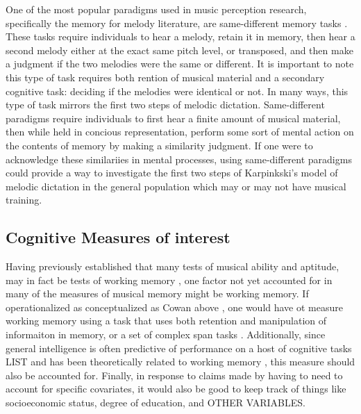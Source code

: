 \documentclass[]{book}
\begin{document}
One of the most popular paradigms used in music perception research, specifically the memory for melody literature, are same-different memory tasks \citep{halpernMemoryMelodies2010}.
These tasks require individuals to hear a melody, retain it in memory, then hear a second melody either at the exact same pitch level, or transposed, and then make a judgment if the two melodies were the same or different.
It is important to note this type of task requires both rention of musical material and a secondary cognitive task: deciding if the melodies were identical or not.
In many ways, this type of task mirrors the first two steps of melodic dictation.
Same-different paradigms require individuals to first hear a finite amount of musical material, then while held in concious representation, perform some sort of mental action on the contents of memory by making a similarity judgment.
If one were to acknowledge these similariies in mental processes, using same-different paradigms could provide a way to investigate the first two steps of Karpinkski's model of melodic dictation in the general population which may or may not have musical training.

\hypertarget{cognitive-measures-of-interest}{%
\subsection{Cognitive Measures of interest}\label{cognitive-measures-of-interest}}

Having previously established that many tests of musical ability and aptitude, may in fact be tests of working memory \citep{berzWorkingMemoryMusic1995}, one factor not yet accounted for in many of the measures of musical memory might be working memory.
If operationalized as conceptualized as Cowan above \citep{cowanMagicalMysteryFour2010}, one would have ot measure working memory using a task that uses both retention and manipulation of informaiton in memory, or a set of complex span tasks \citep{unsworthAutomatedVersionOperation2005}.
Additionally, since general intelligence is often predictive of performance on a host of cognitive tasks LIST and has been theoretically related to working memory \citep{kovacsProcessOverlapTheory2016}, this measure should also be accounted for.
Finally, in response to claims made by \citep{okadaIndividualDifferencesMusical2018a} having to need to account for specific covariates, it would also be good to keep track of things like socioeconomic status, degree of education, and OTHER VARIABLES.
\end{document}
